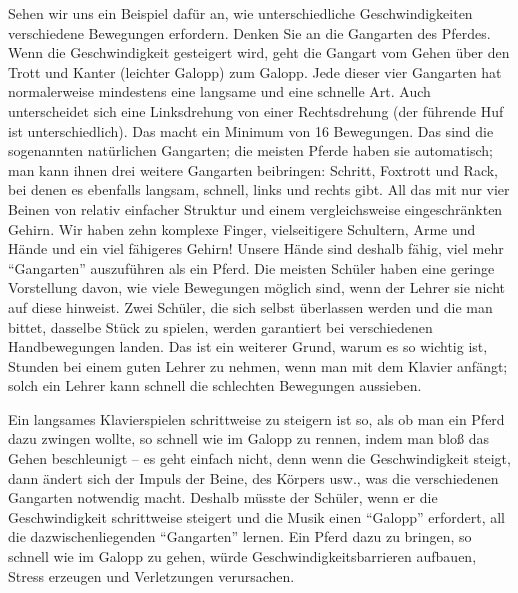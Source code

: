 Sehen wir uns ein Beispiel dafür an, wie unterschiedliche Geschwindigkeiten verschiedene Bewegungen erfordern.
Denken Sie an die Gangarten des Pferdes.
Wenn die Geschwindigkeit gesteigert wird, geht die Gangart vom Gehen über den Trott und Kanter (leichter Galopp) zum Galopp.
Jede dieser vier Gangarten hat normalerweise mindestens eine langsame und eine schnelle Art.
Auch unterscheidet sich eine Linksdrehung von einer Rechtsdrehung (der führende Huf ist unterschiedlich).
Das macht ein Minimum von 16 Bewegungen.
Das sind die sogenannten natürlichen Gangarten; die meisten Pferde haben sie automatisch; man kann ihnen drei weitere Gangarten beibringen: Schritt, Foxtrott und Rack, bei denen es ebenfalls langsam, schnell, links und rechts gibt.
All das mit nur vier Beinen von relativ einfacher Struktur und einem vergleichsweise eingeschränkten Gehirn.
Wir haben zehn komplexe Finger, vielseitigere Schultern, Arme und Hände und ein viel fähigeres Gehirn!
Unsere Hände sind deshalb fähig, viel mehr \enquote{Gangarten} auszuführen als ein Pferd.
Die meisten Schüler haben eine geringe Vorstellung davon, wie viele Bewegungen möglich sind, wenn der Lehrer sie nicht auf diese hinweist.
Zwei Schüler, die sich selbst überlassen werden und die man bittet, dasselbe Stück zu spielen, werden garantiert bei verschiedenen Handbewegungen landen.
Das ist ein weiterer Grund, warum es so wichtig ist, Stunden bei einem guten Lehrer zu nehmen, wenn man mit dem Klavier anfängt; solch ein Lehrer kann schnell die schlechten Bewegungen aussieben.

Ein langsames Klavierspielen schrittweise zu steigern ist so, als ob man ein Pferd dazu zwingen wollte, so schnell wie im Galopp zu rennen, indem man bloß das Gehen beschleunigt -- es geht einfach nicht, denn wenn die Geschwindigkeit steigt, dann ändert sich der Impuls der Beine, des Körpers usw., was die verschiedenen Gangarten notwendig macht.
Deshalb müsste der Schüler, wenn er die Geschwindigkeit schrittweise steigert und die Musik einen \enquote{Galopp} erfordert, all die dazwischenliegenden \enquote{Gangarten} lernen.
Ein Pferd dazu zu bringen, so schnell wie im Galopp zu gehen, würde Geschwindigkeitsbarrieren aufbauen, Stress erzeugen und Verletzungen verursachen.

